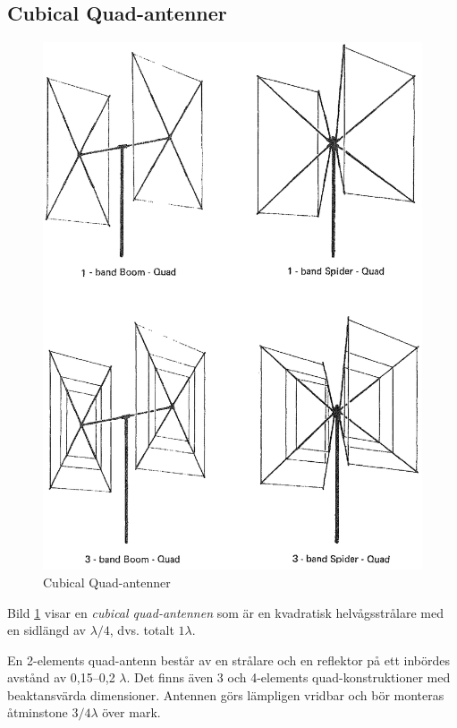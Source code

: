 \subsection{Cubical Quad-antenner}

\begin{figure}
  \includegraphics[width=\textwidth]{images/cropped_pdfs/bild_2_6-19.pdf}
  \caption{Cubical Quad-antenner}
  \label{fig:bildII6-19}
\end{figure}

Bild \ref{fig:bildII6-19} visar en \emph{cubical quad-antennen} som är en
kvadratisk helvågsstrålare med en sidlängd av \(\lambda/4\), dvs. totalt
\(1\lambda\).

En 2-elements quad-antenn består av en strålare och en reflektor på
ett inbördes avstånd av 0,15--0,2 \(\lambda\).
Det finns även 3 och 4-elements quad-konstruktioner med beaktansvärda
dimensioner.
Antennen görs lämpligen vridbar och bör monteras åtminstone \(3/4 \lambda\)
över mark.

